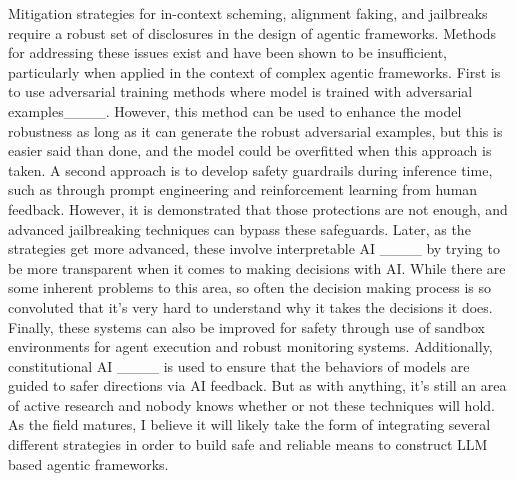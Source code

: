 Mitigation strategies for in-context scheming, alignment faking, and jailbreaks require a robust set of disclosures in the design of agentic frameworks. Methods for addressing these issues exist and have been shown to be insufficient, particularly when applied in the context of complex agentic frameworks. First is to use adversarial training methods where model is trained with adversarial examples____. However, this method can be used to enhance the model robustness as long as it can generate the robust adversarial examples, but this is easier said than done, and the model could be overfitted when this approach is taken. A second approach is to develop safety guardrails during inference time, such as through prompt engineering and reinforcement learning from human feedback. However, it is demonstrated that those protections are not enough, and advanced jailbreaking techniques \cite {Ouyang2022Training, Ziegler2019Fine} can bypass these safeguards. Later, as the strategies get more advanced, these involve interpretable AI ____ by trying to be more transparent when it comes to making decisions with AI. While there are some inherent problems to this area, so often the decision making process is so convoluted that it's very hard to understand why it takes the decisions it does. Finally, these systems can also be improved for safety through use of sandbox environments for agent execution and robust monitoring systems. Additionally, constitutional AI ____ is used to ensure that the behaviors of models are guided to safer directions via AI feedback. But as with anything, it’s still an area of active research and nobody knows whether or not these techniques will hold. As the field matures, I believe it will likely take the form of integrating several different strategies in order to build safe and reliable means to construct LLM based agentic frameworks.


